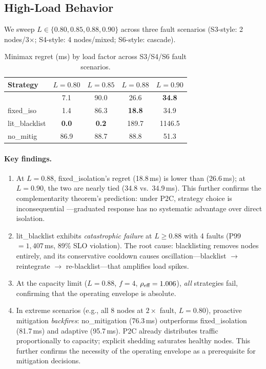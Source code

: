 \subsection{High-Load Behavior}
\label{sec:eval-highload}

We sweep $L \in \{0.80, 0.85, 0.88, 0.90\}$ across three fault
scenarios (S3-style: 2 nodes/3$\times$; S4-style: 4 nodes/mixed;
S6-style: cascade).

\begin{table}[t]
\centering
\caption{Minimax regret (ms) by load factor across S3/S4/S6 fault
  scenarios.}
\label{tab:highload}
\footnotesize
\begin{tabular}{@{}lcccc@{}}
\toprule
Strategy & $L{=}0.80$ & $L{=}0.85$ & $L{=}0.88$ & $L{=}0.90$ \\
\midrule
\system{} & 7.1 & 90.0 & 26.6 & \textbf{34.8} \\
fixed\_iso & 1.4 & 86.3 & \textbf{18.8} & 34.9 \\
lit\_blacklist & \textbf{0.0} & \textbf{0.2} & 189.7 & 1146.5 \\
no\_mitig & 86.9 & 88.7 & 88.8 & 51.3 \\
\bottomrule
\end{tabular}
\end{table}

\paragraph{Key findings.}
\begin{enumerate}
\item At $L = 0.88$, fixed\_isolation's regret (18.8\,ms) is lower
  than \system{} (26.6\,ms); at $L = 0.90$, the two are nearly tied
  (34.8 vs.\ 34.9\,ms). This further confirms the complementarity
  theorem's prediction: under P2C, strategy choice is inconsequential
  ---graduated response has no systematic advantage over direct
  isolation.

\item lit\_blacklist exhibits \emph{catastrophic failure} at $L \geq 0.88$
  with 4 faults (P99 $= 1{,}407$\,ms, 89\% SLO violation). The root
  cause: blacklisting removes nodes entirely, and its conservative
  cooldown causes oscillation---blacklist $\to$ reintegrate $\to$
  re-blacklist---that amplifies load spikes.

\item At the capacity limit ($L = 0.88$, $f = 4$, $\rho_{\text{eff}} = 1.006$),
  \emph{all} strategies fail, confirming that the operating envelope
  is absolute.

\item In extreme scenarios (e.g., all 8 nodes at $2\times$ fault,
  $L = 0.80$), proactive mitigation \emph{backfires}:
  no\_mitigation (76.3\,ms) outperforms fixed\_isolation (81.7\,ms)
  and adaptive (95.7\,ms). P2C already distributes traffic
  proportionally to capacity; explicit shedding saturates healthy
  nodes. This further confirms the necessity of the operating envelope
  as a prerequisite for mitigation decisions.
\end{enumerate}

